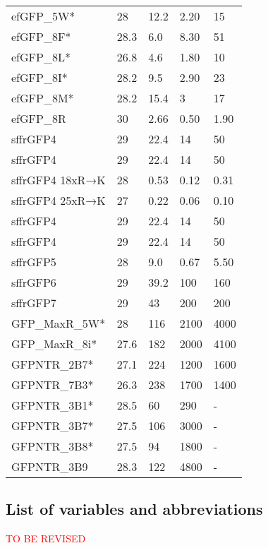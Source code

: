 \documentclass[10pt, a4paper, twocolumn]{article}
\newcommand\todo[1]{\textcolor{red}{#1}}
\begin{document}
\begin{table*}[h]
\begin{minipage}{0.48\linewidth}
{\begin{tabular}{p{3cm}|p{1cm}|p{2cm}|p{1.2cm}|p{1.2cm}}
efGFP\_5W* & 28 & 12.2 & 2.20 & 15 \\
efGFP\_8F* & 28.3 & 6.0 & 8.30 & 51 \\
efGFP\_8L* & 26.8 & 4.6 & 1.80 & 10 \\
efGFP\_8I* & 28.2 & 9.5 & 2.90 & 23 \\
efGFP\_8M* & 28.2 & 15.4 & 3 & 17 \\
efGFP\_8R & 30 & 2.66 & 0.50 & 1.90 \\
sffrGFP4 & 29 & 22.4 & 14 & 50 \\
sffrGFP4 & 29 & 22.4 & 14 & 50 \\
sffrGFP4 18xR→K & 28 & 0.53 & 0.12 & 0.31 \\
sffrGFP4 25xR→K & 27 & 0.22 & 0.06 & 0.10 \\
sffrGFP4 & 29 & 22.4 & 14 & 50 \\
sffrGFP4 & 29 & 22.4 & 14 & 50 \\
sffrGFP5 & 28 & 9.0 & 0.67 & 5.50 \\
sffrGFP6 & 29 & 39.2 & 100 & 160 \\
sffrGFP7 & 29 & 43 & 200 & 200 \\
GFP\_MaxR\_5W* & 28 & 116 & 2100 & 4000 \\
GFP\_MaxR\_8i* & 27.6 & 182 & 2000 & 4100 \\
GFPNTR\_2B7* & 27.1 & 224 & 1200 & 1600 \\
GFPNTR\_7B3* & 26.3 & 238 & 1700 & 1400 \\
GFPNTR\_3B1* & 28.5 & 60 & 290 & - \\
GFPNTR\_3B7* & 27.5 & 106 & 3000 & - \\
GFPNTR\_3B8* & 27.5 & 94 & 1800 & - \\
GFPNTR\_3B9 & 28.3 & 122 & 4800 & - \\
\end{tabular}
}
\label{tbl:attr_probes}
\end{minipage}
\end{table*}





\onecolumn
\subsection*{List of variables and abbreviations}
\todo{TO BE REVISED}
\end{document}
